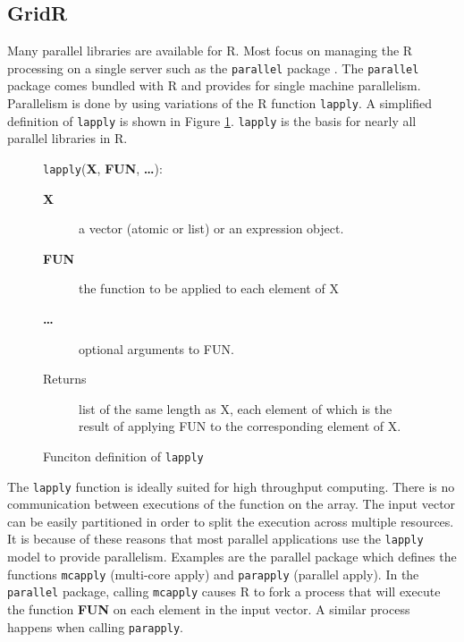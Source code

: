 \subsection{GridR}
Many parallel libraries are available for R.  Most focus on managing the R processing on a single server such as the \texttt{parallel} package \cite{rparallelpackage}.  The \texttt{parallel} package comes bundled with R and provides for single machine parallelism.  Parallelism is done by using variations of the R function \texttt{lapply}.  A simplified definition of \texttt{lapply} is shown in Figure \ref{lst:lapply}.  \texttt{lapply} is the basis for nearly all parallel libraries in R.  

\begin{figure}[ht!]
\begin{framed}
\texttt{lapply}(\textbf{X}, \textbf{FUN}, \textbf{\ldots}):
\begin{description}
\item[\textbf{X}] a vector (atomic or list) or an expression object.
\item[\textbf{FUN}] the function to be applied to each element of X
\item[\textbf{\ldots}] optional arguments to FUN.
\item[Returns] list of the same length as X, each element of which is the result of applying FUN to the corresponding element of X.
\end{description}
\end{framed}

\centering
\captionsetup{justification=centering}
\caption{Funciton definition of \texttt{lapply}}
\label{lst:lapply}
\end{figure}

The \texttt{lapply} function is ideally suited for high throughput computing.  There is no communication between executions of the function on the array.  The input vector can be easily partitioned in order to split the execution across multiple resources.  It is because of these reasons that most parallel applications use the \texttt{lapply} model to provide parallelism.  Examples are the parallel package which defines the functions \texttt{mcapply} (multi-core apply) and \texttt{parapply} (parallel apply). In the \texttt{parallel} package, calling \texttt{mcapply} causes R to fork a process that will execute the function \textbf{FUN} on each element in the input vector.  A similar process happens when calling \texttt{parapply}. 

